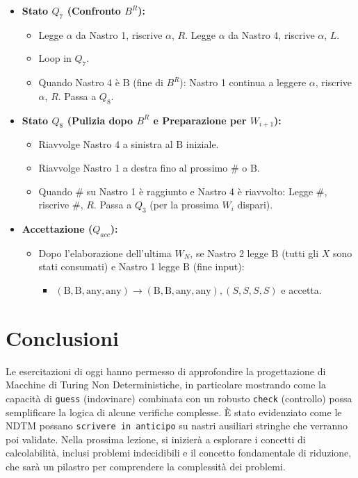 \documentclass[a4paper]{article}
\newcommand{\B}{\text{B}} %
\begin{document}
\begin{itemize}
\begin{itemize}
        \end{itemize}
    \item \textbf{Stato $Q_7$ (Confronto $B^R$):}
        \begin{itemize}
            \item Legge $\alpha$ da Nastro 1, riscrive $\alpha$, $R$. Legge $\alpha$ da Nastro 4, riscrive $\alpha$, $L$.
            \item Loop in $Q_7$.
            \item Quando Nastro 4 è $\B$ (fine di $B^R$): Nastro 1 continua a leggere $\alpha$, riscrive $\alpha$, $R$. Passa a $Q_8$.
        \end{itemize}
    \item \textbf{Stato $Q_8$ (Pulizia dopo $B^R$ e Preparazione per $W_{i+1}$):}
        \begin{itemize}
            \item Riavvolge Nastro 4 a sinistra al $\B$ iniziale.
            \item Riavvolge Nastro 1 a destra fino al prossimo $\#$ o $\B$.
            \item Quando $\#$ su Nastro 1 è raggiunto e Nastro 4 è riavvolto: Legge $\#$, riscrive $\#$, $R$. Passa a $Q_3$ (per la prossima $W_i$ dispari).
        \end{itemize}
    \item \textbf{Accettazione ($Q_{acc}$):}
        \begin{itemize}
            \item Dopo l'elaborazione dell'ultima $W_N$, se Nastro 2 legge $\B$ (tutti gli $X$ sono stati consumati) e Nastro 1 legge $\B$ (fine input):
                \begin{itemize}
                    \item $(\B, \B, \text{any}, \text{any}) \to (\B, \B, \text{any}, \text{any}), (S,S,S,S)$ e accetta.
                \end{itemize}
        \end{itemize}
\end{itemize}

\section{Conclusioni}
Le esercitazioni di oggi hanno permesso di approfondire la progettazione di Macchine di Turing Non Deterministiche, in particolare mostrando come la capacità di \texttt{guess} (indovinare) combinata con un robusto \texttt{check} (controllo) possa semplificare la logica di alcune verifiche complesse. È stato evidenziato come le NDTM possano \texttt{scrivere in anticipo} su nastri ausiliari stringhe che verranno poi validate.
Nella prossima lezione, si inizierà a esplorare i concetti di calcolabilità, inclusi problemi indecidibili e il concetto fondamentale di riduzione, che sarà un pilastro per comprendere la complessità dei problemi.
\end{document}
